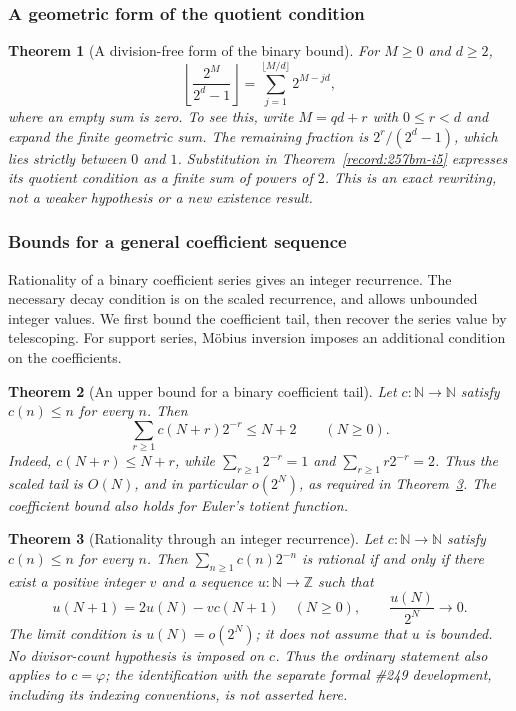 \documentclass[11pt]{article}
\theoremstyle{plain}
\newtheorem{thm}{Theorem}[section]
\theoremstyle{definition}
\theoremstyle{remark}
\newcommand{\N}{\mathbb{N}}
\newcommand{\Z}{\mathbb{Z}}
\begin{document}
\subsubsection*{A geometric form of the quotient condition}

\begin{thm}[A division-free form of the binary bound]\label{record:257bm-i12}
For $M\ge0$ and $d\ge2$,
\[
 \left\lfloor\frac{2^M}{2^d-1}\right\rfloor
   =\sum_{j=1}^{\lfloor M/d\rfloor}2^{M-jd},
\]
where an empty sum is zero. To see this, write $M=qd+r$ with
$0\le r<d$ and expand the finite geometric sum. The remaining fraction
is $2^r/(2^d-1)$, which lies strictly between $0$ and $1$.
Substitution in Theorem~\ref{record:257bm-i5} expresses its quotient
condition as a finite sum of powers of $2$. This is an exact rewriting,
not a weaker hypothesis or a new existence result.
\end{thm}

\subsubsection*{Bounds for a general coefficient sequence}
Rationality of a binary coefficient series gives an integer recurrence.
The necessary decay condition is on the scaled recurrence, and allows
unbounded integer values. We first bound the coefficient tail, then
recover the series value by telescoping. For support series, M\"obius
inversion imposes an additional condition on the coefficients.


\begin{thm}[An upper bound for a binary coefficient tail]\label{record:257bm-i2}
Let $c:\N\to\N$ satisfy $c(n)\le n$ for every $n$.  Then
\[
 \sum_{r\ge1}c(N+r)2^{-r}\le N+2\qquad(N\ge0).
\]
Indeed, $c(N+r)\le N+r$, while $\sum_{r\ge1}2^{-r}=1$ and
$\sum_{r\ge1}r2^{-r}=2$.  Thus the scaled tail is $O(N)$, and in
particular $o(2^N)$, as required in Theorem~\ref{record:257bm-i-t7}.
The coefficient bound also holds for Euler's totient function.
\end{thm}

\begin{thm}[Rationality through an integer recurrence]\label{record:257bm-i-t7}
Let $c:\N\to\N$ satisfy $c(n)\le n$ for every $n$.  Then
$\sum_{n\ge1}c(n)2^{-n}$ is rational if and only if there exist a positive
integer $v$ and a sequence $u:\N\to\Z$ such that
\[
 u(N+1)=2u(N)-v c(N+1)\quad(N\ge0),\qquad
 \frac{u(N)}{2^N}\longrightarrow0.
\]
The limit condition is $u(N)=o(2^N)$; it does not assume that $u$ is bounded.
No divisor-count hypothesis is imposed on $c$.  Thus the ordinary statement
also applies to $c=\varphi$; the identification with the separate formal
\#249 development, including its indexing conventions, is not asserted here.
\end{thm}
\end{document}
